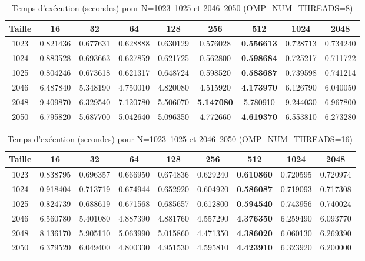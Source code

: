 \documentclass[a4paper,13pt]{book}
\begin{document}
\begin{table}[ht]
    \centering
    \caption{Temps d'exécution (secondes) pour N=1023--1025 et 2046--2050 (OMP\_NUM\_THREADS=8)}
    \label{tab:threads8}
    \begin{tabular}{|c|c|c|c|c|c|c|c|c|}\hline
    Taille & 16 & 32 & 64 & 128 & 256 & 512 & 1024 & 2048 \\\hline
    1023 & 0.821436 & 0.677631 & 0.628888 & 0.630129 & 0.576028 & \textbf{0.556613} & 0.728713 & 0.734240 \\\hline
    1024 & 0.883528 & 0.693663 & 0.627859 & 0.621725 & 0.562800 & \textbf{0.598684} & 0.725217 & 0.711722 \\\hline
    1025 & 0.804246 & 0.673618 & 0.621317 & 0.648724 & 0.598520 & \textbf{0.583687} & 0.739598 & 0.741214 \\\hline
    2046 & 6.487840 & 5.348190 & 4.750010 & 4.820080 & 4.515920 & \textbf{4.173970} & 6.126790 & 6.040050 \\\hline
    2048 & 9.409870 & 6.329540 & 7.120780 & 5.506070 & \textbf{5.147080} & 5.780910 & 9.244030 & 6.967800 \\\hline
    2050 & 6.795820 & 5.687700 & 5.042640 & 5.096350 & 4.772660 & \textbf{4.619370} & 6.553810 & 6.273280 \\\hline
    \end{tabular}
\end{table}
\begin{table}[ht]
    \centering
    \caption{Temps d'exécution (secondes) pour N=1023--1025 et 2046--2050 (OMP\_NUM\_THREADS=16)}
    \label{tab:threads16}
    \begin{tabular}{|c|c|c|c|c|c|c|c|c|}\hline
    Taille & 16 & 32 & 64 & 128 & 256 & 512 & 1024 & 2048 \\\hline
    1023 & 0.838795 & 0.696357 & 0.666950 & 0.674836 & 0.629240 & \textbf{0.610860} & 0.720595 & 0.720974 \\\hline
    1024 & 0.918404 & 0.713719 & 0.674944 & 0.652920 & 0.604920 & \textbf{0.586087} & 0.719093 & 0.717308 \\\hline
    1025 & 0.824739 & 0.688619 & 0.671568 & 0.685657 & 0.612800 & \textbf{0.594540} & 0.743956 & 0.740024 \\\hline
    2046 & 6.560780 & 5.401080 & 4.887390 & 4.881760 & 4.557290 & \textbf{4.376350} & 6.259490 & 6.093770 \\\hline
    2048 & 8.136170 & 5.905110 & 5.063990 & 5.015860 & 4.471350 & \textbf{4.386020} & 6.060130 & 6.269390 \\\hline
    2050 & 6.379520 & 6.049400 & 4.800330 & 4.951530 & 4.595810 & \textbf{4.423910} & 6.323920 & 6.200000 \\\hline
    \end{tabular}
\end{table}
    
\end{document}
